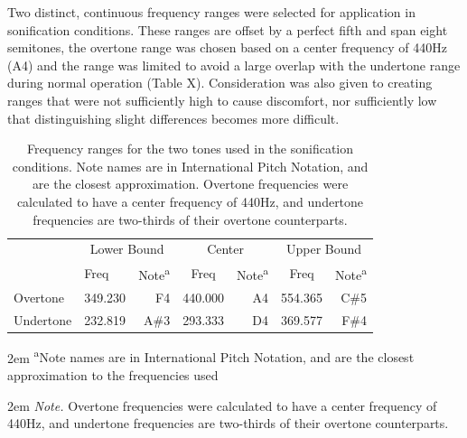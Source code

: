 \documentclass[10pt,a4paper,onecolumn]{article}
\begin{document}
Two distinct, continuous frequency ranges were selected for application in sonification conditions. These ranges are offset by a perfect fifth and span eight semitones, the overtone range was chosen based on a center frequency of 440Hz (A4) and the range was limited to avoid a large overlap with the undertone range during normal operation (Table X). Consideration was also given to creating ranges that were not sufficiently high to cause discomfort, nor sufficiently low that distinguishing slight differences becomes more difficult.

\begin{table}[!h]

\begin{threeparttable}
\caption{\label{tab:frequency-ranges}Frequency ranges for the two tones used in the sonification conditions. Note names are in International Pitch Notation, and are the closest approximation. Overtone frequencies were calculated to have a center frequency of 440Hz, and undertone frequencies are two-thirds of their overtone counterparts.}
\centering
\fontsize{7}{9}\selectfont
\begin{tabular}[t]{>{}l>{}l>{}r>{}c>{}r>{}c>{}r}
\toprule
\multicolumn{1}{c}{} & \multicolumn{2}{c}{Lower Bound} & \multicolumn{2}{c}{Center} & \multicolumn{2}{c}{Upper Bound} \\
\cmidrule(l{3pt}r{3pt}){2-3} \cmidrule(l{3pt}r{3pt}){4-5} \cmidrule(l{3pt}r{3pt}){6-7}
  & Freq & Note\textsuperscript{a} & Freq & Note\textsuperscript{a} & Freq & Note\textsuperscript{a}\\
\midrule
Overtone & 349.230 & F4 & 440.000 & A4 & 554.365 & C\#5\\
Undertone & 232.819 & A\#3 & 293.333 & D4 & 369.577 & F\#4\\
\bottomrule
\end{tabular}
\begin{tablenotes}
\small
\item [] 
\rightskip2em
{\footnotesize \sffamily \textsuperscript{a}Note names are in International Pitch Notation, and are the closest approximation to the frequencies used}
\item [] 
\rightskip2em
{\footnotesize \sffamily \textit{Note.} Overtone frequencies were calculated to have a center frequency of 440Hz, and undertone frequencies are two-thirds of their overtone counterparts.}
\end{tablenotes}
\end{threeparttable}
\end{table}
\end{document}
